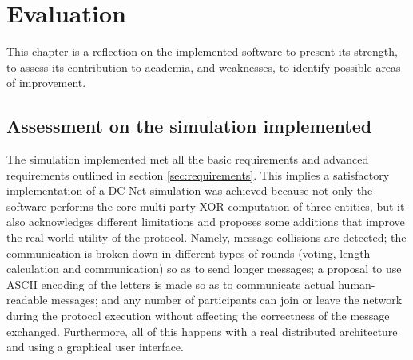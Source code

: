 \chapter{Evaluation}
This chapter is a reflection on the implemented software to present its strength, to assess its contribution to academia,  and weaknesses, to identify possible areas of improvement. 

\section{Assessment on the simulation implemented}
The simulation implemented met all the basic requirements and advanced requirements outlined in section \ref{sec:requirements}. This implies a satisfactory implementation of a DC-Net simulation was achieved because not only the software performs the core multi-party XOR computation of three entities, but it also acknowledges different limitations and proposes some additions that improve the real-world utility of the protocol. Namely, message collisions are detected; the communication is broken down in different types of rounds (voting, length calculation and communication) so as to send longer messages; a proposal to use ASCII encoding of the letters is made so as to communicate actual human-readable messages; and any number of participants can join or leave the network during the protocol execution without affecting the correctness of the message exchanged. Furthermore, all of this happens with a real distributed architecture and using a graphical user interface.


